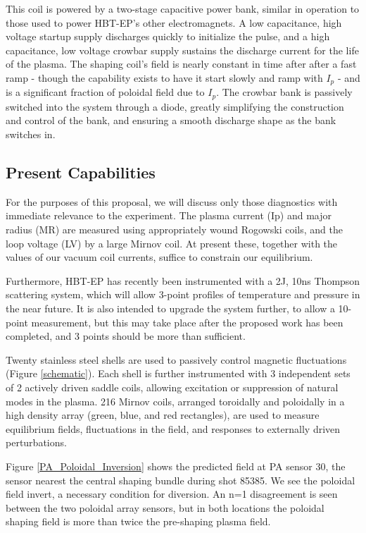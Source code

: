\documentclass[aps,prl,twocolumn,superscriptaddress,groupedaddress]{revtex4}  %
\begin{document}
This coil is powered by a two-stage capacitive power bank, similar in operation to those used to power HBT-EP's other electromagnets\cite{Gates}. A low capacitance, high voltage startup supply discharges quickly to initialize the pulse, and a high capacitance, low voltage crowbar supply sustains the discharge current for the life of the plasma.  The shaping coil's field is nearly constant in time after after a fast ramp - though the capability exists to have it start slowly and ramp with $I_p$ - and is a significant fraction of poloidal field due to $I_p$.  The crowbar bank is passively switched into the system through a diode, greatly simplifying the construction and control of the bank, and ensuring a smooth discharge shape as the bank switches in.
\subsection{Present Capabilities}
	For the purposes of this proposal, we will discuss only those diagnostics with immediate relevance to the experiment.  The plasma current (Ip) and major radius (MR) are measured using appropriately wound Rogowski coils, and the loop voltage (LV) by a large Mirnov coil.  At present these, together with the values of our vacuum coil currents, suffice to constrain our equilibrium.\par
	Furthermore, HBT-EP has recently been instrumented with a 2J, 10ns Thompson scattering system, which will allow 3-point profiles of temperature and pressure in the near future.  It is also intended to upgrade the system further, to allow a 10-point measurement, but this may take place after the proposed work has been completed, and 3 points should be more than sufficient.\par
	Twenty stainless steel shells are used to passively control magnetic fluctuations (Figure \ref{schematic}).  Each shell is further instrumented with 3 independent sets of 2 actively driven saddle coils, allowing excitation or suppression of natural modes in the plasma.  216 Mirnov coils, arranged toroidally and poloidally in a high density array (green, blue, and red rectangles), are used to measure equilibrium fields, fluctuations in the field, and responses to externally driven perturbations.\par
	Figure \ref{PA_Poloidal_Inversion} shows the predicted field at PA sensor 30, the sensor nearest the central shaping bundle during shot 85385.  We see the poloidal field invert, a necessary condition for diversion.  An n=1 disagreement is seen between the two poloidal array sensors, but in both locations the poloidal shaping field is more than twice the pre-shaping plasma field.
	
\end{document}
